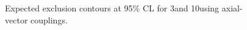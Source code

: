 \begin{figure}[h]
  \centering
  \caption{\label{fig:limits_A} Expected exclusion contours at 95\% CL for 3\fbinv and 10\fbinv using axial-vector couplings. }
\end{figure}

